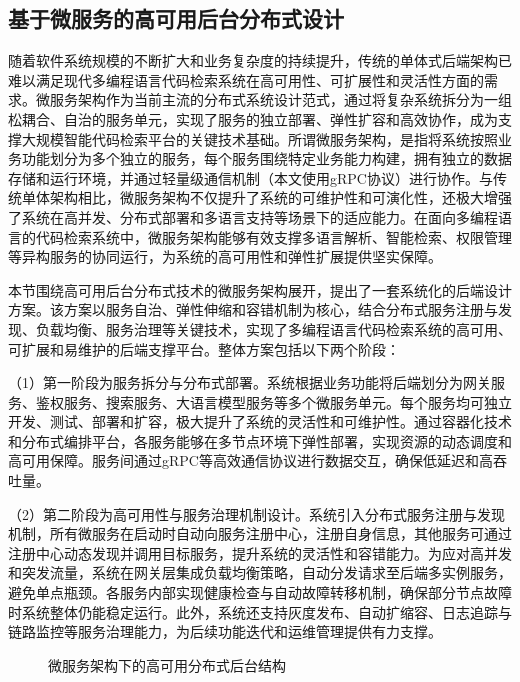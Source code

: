 \documentclass[UTF8,a4paper,12pt]{ctexart}
\numberwithin{equation}{section}
\begin{document}
\subsection{基于微服务的高可用后台分布式设计}
随着软件系统规模的不断扩大和业务复杂度的持续提升，传统的单体式后端架构已难以满足现代多编程语言代码检索系统在高可用性、可扩展性和灵活性方面的需求。微服务架构作为当前主流的分布式系统设计范式，通过将复杂系统拆分为一组松耦合、自治的服务单元，实现了服务的独立部署、弹性扩容和高效协作，成为支撑大规模智能代码检索平台的关键技术基础。所谓微服务架构，是指将系统按照业务功能划分为多个独立的服务，每个服务围绕特定业务能力构建，拥有独立的数据存储和运行环境，并通过轻量级通信机制（本文使用gRPC协议）进行协作。与传统单体架构相比，微服务架构不仅提升了系统的可维护性和可演化性，还极大增强了系统在高并发、分布式部署和多语言支持等场景下的适应能力。在面向多编程语言的代码检索系统中，微服务架构能够有效支撑多语言解析、智能检索、权限管理等异构服务的协同运行，为系统的高可用性和弹性扩展提供坚实保障。\par
本节围绕高可用后台分布式技术的微服务架构展开，提出了一套系统化的后端设计方案。该方案以服务自治、弹性伸缩和容错机制为核心，结合分布式服务注册与发现、负载均衡、服务治理等关键技术，实现了多编程语言代码检索系统的高可用、可扩展和易维护的后端支撑平台。整体方案包括以下两个阶段：\par
（1）第一阶段为服务拆分与分布式部署。系统根据业务功能将后端划分为网关服务、鉴权服务、搜索服务、大语言模型服务等多个微服务单元。每个服务均可独立开发、测试、部署和扩容，极大提升了系统的灵活性和可维护性。通过容器化技术和分布式编排平台，各服务能够在多节点环境下弹性部署，实现资源的动态调度和高可用保障。服务间通过gRPC等高效通信协议进行数据交互，确保低延迟和高吞吐量。\par
（2）第二阶段为高可用性与服务治理机制设计。系统引入分布式服务注册与发现机制，所有微服务在启动时自动向服务注册中心，注册自身信息，其他服务可通过注册中心动态发现并调用目标服务，提升系统的灵活性和容错能力。为应对高并发和突发流量，系统在网关层集成负载均衡策略，自动分发请求至后端多实例服务，避免单点瓶颈。各服务内部实现健康检查与自动故障转移机制，确保部分节点故障时系统整体仍能稳定运行。此外，系统还支持灰度发布、自动扩缩容、日志追踪与链路监控等服务治理能力，为后续功能迭代和运维管理提供有力支撑。\par
\begin{figure}[H]
	\caption{微服务架构下的高可用分布式后台结构}
	\label{microservice_arch}
\end{figure}
\end{document}
